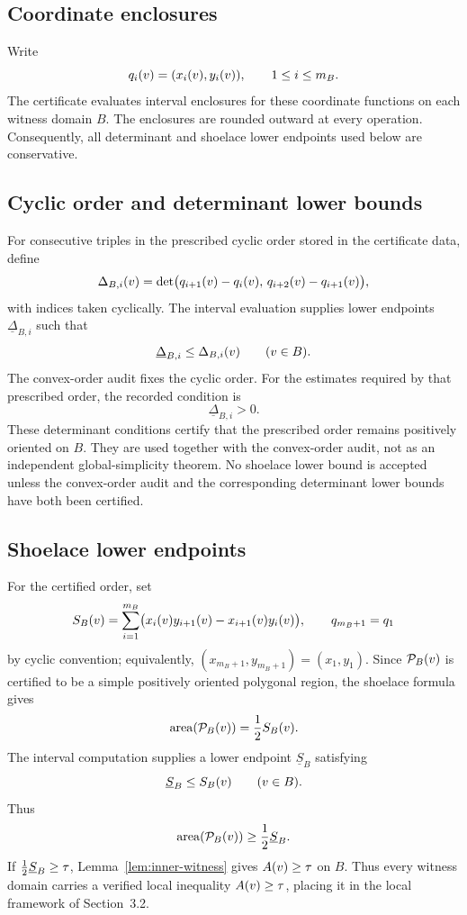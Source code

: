 \documentclass[11pt]{article}
\begin{document}
\subsection{Coordinate enclosures}

Write
\[
q_i(v)=(x_i(v),y_i(v)),
\qquad 1\le i\le m_B.
\]
The certificate evaluates interval enclosures for these coordinate functions on each witness domain \(B\).  The enclosures are rounded outward at every operation.  Consequently, all determinant and shoelace lower endpoints used below are conservative.

\subsection{Cyclic order and determinant lower bounds}

For consecutive triples in the prescribed cyclic order stored in the certificate data, define
\[
\Delta_{B,i}(v)
=
\det\bigl(q_{i+1}(v)-q_i(v),\,
q_{i+2}(v)-q_{i+1}(v)\bigr),
\]
with indices taken cyclically.  The interval evaluation supplies lower endpoints \(\underline\Delta_{B,i}\) such that
\[
\underline\Delta_{B,i}\le \Delta_{B,i}(v)
\qquad(v\in B).
\]
The convex-order audit fixes the cyclic order.  For the estimates required by that prescribed order, the recorded condition is
\[
\underline\Delta_{B,i}>0.
\]
These determinant conditions certify that the prescribed order remains positively oriented on \(B\).  They are used together with the convex-order audit, not as an independent global-simplicity theorem.  No shoelace lower bound is accepted unless the convex-order audit and the corresponding determinant lower bounds have both been certified.

\subsection{Shoelace lower endpoints}

For the certified order, set
\[
S_B(v)=
\sum_{i=1}^{m_B}
\bigl(x_i(v)y_{i+1}(v)-x_{i+1}(v)y_i(v)\bigr),
\qquad q_{m_B+1}=q_1
\]
by cyclic convention; equivalently, \((x_{m_B+1},y_{m_B+1})=(x_1,y_1)\).  Since \(\mathcal P_B(v)\) is certified to be a simple positively oriented polygonal region, the shoelace formula gives
\[
\operatorname{area}(\mathcal P_B(v))=\frac12 S_B(v).
\]
The interval computation supplies a lower endpoint \(\underline S_B\) satisfying
\[
\underline S_B\le S_B(v)
\qquad(v\in B).
\]
Thus
\[
\operatorname{area}(\mathcal P_B(v))\ge \frac12\underline S_B.
\]
If \(\frac12\underline S_B\ge\tau\), Lemma~\ref{lem:inner-witness} gives \(A(v)\ge\tau\) on \(B\).  Thus every witness domain carries a verified local inequality \(A(v)\ge\tau\), placing it in the local framework of Section~3.2.
\end{document}
